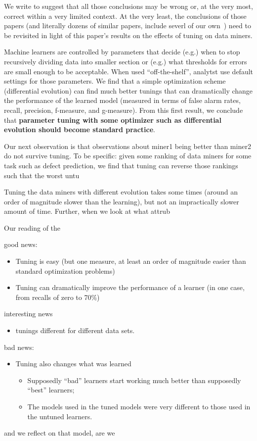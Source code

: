 \documentclass{sig-alternative}
\newcommand{\bi}{\begin{itemize}[leftmargin=0.4cm]}
\newcommand{\ei}{\end{itemize}}
\begin{document}
 


We write to suggest that all those conclusions may be wrong or, at the very most,
correct within a very limited context. At the very least, the conclusions
of those papers (and literally dozens of similar papers, include severl
of our own~\cite{me02e,me02k,me03a,me06d,me07b}) need to be revisited
in light of this paper's results on the effects of tuning on data miners.

Machine learners
are controlled by parameters that decide (e.g.) when to stop recursively
dividing data into smaller section or (e.g.) what thresholds for errors are small
enough to be acceptable. When used ``off-the-shelf'', analytst
use default settings for those parameters. We find that  a 
simple optimization scheme (differential evolution) can find much
better tunings that can dramatically change the performance of
the learned model (measured in terms of false alarm rates, recall,
precision, f-measure, and g-measure).  From this first result,
we conclude that {\bf parameter tuning with some optimizer such as differential
evolution should become standard practice}.

Our next observation is that observations about miner1 being better
than miner2 do not survive tuning. To be specific: given some
ranking of data miners for some task such as defect prediction,
we find that tuning can reverse those rankings such that the worst untu


Tuning the data miners with different evolution takes some
times (around an order of magnitude slower than the learning), but not an impractically slower amount of time. Further, when we look at what
attrub


Our reading of the 

good news:
\bi 
\item Tuning is easy (but one measure, at least an order of magnitude easier than 
standard optimization problems)
\item Tuning can dramatically improve the performance of a learner (in one case, from recalls
of zero to 70\%)
\ei
interesting news
\bi 
\item tunings different for different data sets.
\ei 
bad news:
\bi
\item Tuning also changes what was learned
\bi
\item Supposedly ``bad'' learners start working much better than supposedly ``best'' learners;
\item The models used in the tuned models were very different to those used in the untuned learners.
\ei 
\ei 
and we reflect on that model, are we 
\end{document}
